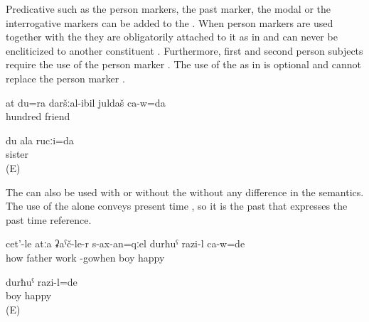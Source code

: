 Predicative  such as the person markers, the past marker, the modal  or the interrogative markers can be added to the  . When person markers are used together with the  they are obligatorily attached to it as in  and can never be encliticized to another constituent . Furthermore, first and second person subjects require the use of the person marker . The use of the  as in  is optional and cannot replace the person marker .
%
\begin{exe}
	\ex	\label{ex:‎‎I am your 100th friend}
	\gll	at	du=ra	daršːal-ibil	juldaš	ca-w=da\\
				hundred	friend	\\
	\glt	{}



	\ex	\label{ex:ungrammaticalIamyoursisterA_1}
	\gll	du ala rucːi=da \\
				sister	\\
	\glt	{} (E)
	
	
\end{exe}

The   can also be used with  or without the   without any difference in the semantics. The use of the  alone conveys present time , so it is the past  that expresses the past time reference. 
%
\begin{exe}
	\ex	\label{ex:‎When the father came back from work, the boy was happy}
	\gll	cet'-le	atːa	ʡaˁč-le-r	s-ax-an=qːel	durħuˁ	razi-l	ca-w=de\\
		how	father	work	-gowhen	boy	happy	\\
	\glt	{}

	\ex	\label{ex:The boy was happy.COP}
	\gll	durħuˁ	razi-l=de\\
		boy	happy\\
	\glt	{} (E)
\end{exe}

